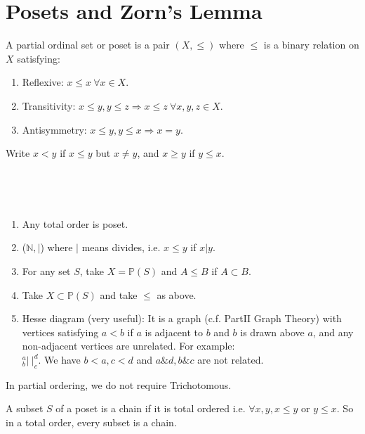 \section{Posets and Zorn's Lemma}
\begin{definition} A partial ordinal set or poset is a pair $(X, \le)$
where $\le$ is a binary relation on $X$ satisfying:
\begin{enumerate}
\item Reflexive: $x \le x ~\forall x \in X$.\\
\item Transitivity: $x \le y, y \le z \Rightarrow x \le z ~\forall x,y,z \in X$.\\
\item Antisymmetry: $x \le y, y \le x \Rightarrow x=y$.
\end{enumerate}
Write $x < y$ if $x \le y$ but $x \neq y$, and $x \ge y$ if $y \le x$.
\end{definition}
~\\
\begin{example}
~\\
\begin{enumerate}
\item Any total order is poset.\\
\item ($\mathbb{N}, |$) where $|$ means divides, i.e. $x \le y$ if $x | y$.\\
\item For any set $S$, take $X = \mathbb{P}(S)$ and $A \le B$ if $A \subset B$.\\
\item Take $X \subset \mathbb{P}(S)$ and take $\le$ as above.\\
\item Hesse diagram (very useful): It is a graph (c.f. PartII Graph Theory)
with vertices satisfying $a < b$ if $a$ is adjacent to $b$ and $b$
is drawn above $a$, and any non-adjacent vertices are unrelated.
    For example:\\
    $^a_b|~ | _c ^d$. We have $b<a, c<d$ and  $a \& d, b \& c$ are not related.
\end{enumerate}
\end{example}
\begin{remark} In partial ordering, we do not require Trichotomous.
\end{remark}
\begin{definition} A subset $S$ of a poset is a chain if it is total
ordered i.e. $\forall x, y, x \le y$ or $y \le x$. So in a total order,
every subset is a chain.
\end{definition}
